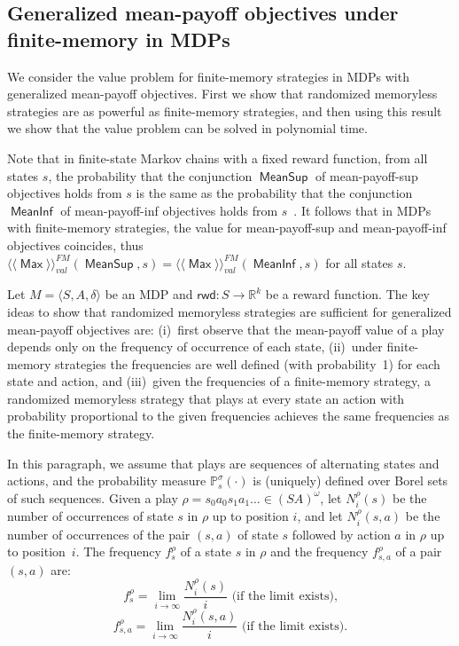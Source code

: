 \documentclass{article}
\newcommand{\real}{\mathbb R}
\newcommand{\tuple}[1]{\langle #1 \rangle}
\newcommand{\PP}{\delta}
\newcommand{\winval}[1]{\langle \! \langle #1 \rangle\! \rangle_{\mathit{val}} }
\newcommand{\vaf}{\winval{\ma}^{{FM}}}
\newcommand{\straa}{\sigma}
\DeclareMathOperator{\ma}{\mathsf{Max}}
\newcommand{\prob}[1]{\mathbb{P}_{#1}}
\newcommand{\rwd}{\mathsf{rwd}}
\newcommand{\MeanSup}{\operatorname{\mathsf{MeanSup}}}
\newcommand{\MeanInf}{\operatorname{\mathsf{MeanInf}}}
\begin{document}
\subsection{Generalized mean-payoff objectives under finite-memory in MDPs}

We consider the value problem for finite-memory strategies
in MDPs with generalized mean-payoff objectives. 
First we show that randomized memoryless strategies are as powerful as 
finite-memory strategies, and then using this result we show that the 
value problem can be solved in polynomial time.

Note that in finite-state Markov chains with a fixed reward function, from all states $s$, 
the probability that the conjunction $\MeanSup$ of mean-payoff-sup objectives holds from $s$ is 
the same as the probability that the conjunction $\MeanInf$ of mean-payoff-inf objectives holds 
from $s$~\cite{FV97}. It follows that in MDPs with finite-memory strategies, the 
value for mean-payoff-sup and mean-payoff-inf objectives coincides, thus
$\vaf(\MeanSup, s) = \vaf(\MeanInf, s)$ for all states $s$.


\smallskip{}
Let $M = \tuple{S, A, \PP}$ be an MDP and $\rwd: S \to \real^k$
be a reward function. The key ideas to show that randomized memoryless strategies
are sufficient for generalized mean-payoff objectives are: (i)~first observe that the mean-payoff value of a play depends only on the frequency of 
occurrence of each state, (ii)~under finite-memory strategies the frequencies are well defined 
(with probability~1) for each state and action, and (iii)~given the frequencies of a
finite-memory strategy, a randomized memoryless strategy that plays at every state an 
action with probability proportional to the given frequencies achieves the same frequencies
as the finite-memory strategy.


\smallskip{}
In this paragraph, we assume that plays are sequences of alternating
states and actions, and the probability measure $\prob{s}^{\straa}(\cdot)$
is (uniquely) defined over Borel sets of such sequences.
Given a play $\rho = s_0 a_0 s_1 a_1 \dots \in (S A)^\omega$, let $N_i^{\rho}(s)$ be the 
number of occurrences of state $s$ in $\rho$ up to position $i$, and
let $N_i^{\rho}(s,a)$ be the number of occurrences of the pair $(s,a)$ of state $s$
followed by action $a$ in $\rho$ up to position~$i$.
The frequency $f_s^\rho$ of a state $s$ in $\rho$ and 
the frequency $f_{s,a}^\rho$ of a pair $(s,a)$ are:
$$f_s^\rho = \lim_{i \to \infty} \frac{N_i^{\rho}(s)}{i} \text{ (if the limit exists),}$$ 
$$f_{s,a}^\rho = \lim_{i \to \infty} \frac{N_i^{\rho}(s,a)}{i} \text{ (if the limit exists)}.$$
\end{document}
